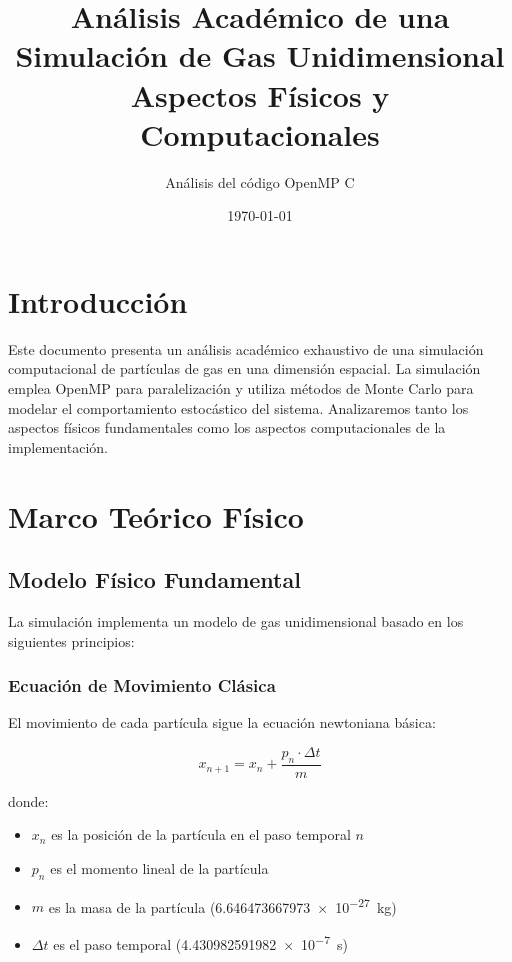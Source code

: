 \documentclass[12pt,a4paper]{article}
\title{\textbf{Análisis Académico de una Simulación de Gas Unidimensional}\\
       \large{Aspectos Físicos y Computacionales}}
\author{Análisis del código OpenMP C}
\date{\today}
\begin{document}
\maketitle

\tableofcontents
\newpage

\section{Introducción}

Este documento presenta un análisis académico exhaustivo de una simulación computacional de partículas de gas en una dimensión espacial. La simulación emplea OpenMP para paralelización y utiliza métodos de Monte Carlo para modelar el comportamiento estocástico del sistema. Analizaremos tanto los aspectos físicos fundamentales como los aspectos computacionales de la implementación.

\section{Marco Teórico Físico}

\subsection{Modelo Físico Fundamental}

La simulación implementa un modelo de gas unidimensional basado en los siguientes principios:

\subsubsection{Ecuación de Movimiento Clásica}

El movimiento de cada partícula sigue la ecuación newtoniana básica:

\begin{equation}
x_{n+1} = x_n + \frac{p_n \cdot \Delta t}{m}
\end{equation}

donde:
\begin{itemize}
    \item $x_n$ es la posición de la partícula en el paso temporal $n$
    \item $p_n$ es el momento lineal de la partícula
    \item $m$ es la masa de la partícula (\SI{6.646473667973e-27}{\kilogram})
    \item $\Delta t$ es el paso temporal (\SI{4.430982591982e-7}{\second})
\end{itemize}
\end{document}
